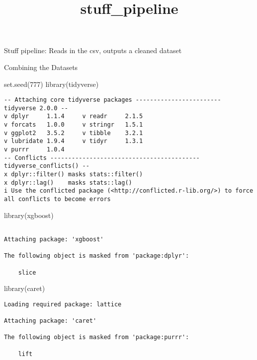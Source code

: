 \documentclass[
  letterpaper,
  DIV=11,
  numbers=noendperiod]{scrartcl}
\title{stuff\_pipeline}
\author{}
\date{}
\newenvironment{Shaded}{\begin{snugshade}}{\end{snugshade}}
\newcommand{\DecValTok}[1]{\textcolor[rgb]{0.68,0.00,0.00}{#1}}
\newcommand{\FunctionTok}[1]{\textcolor[rgb]{0.28,0.35,0.67}{#1}}
\newcommand{\NormalTok}[1]{\textcolor[rgb]{0.00,0.23,0.31}{#1}}
\begin{document}
\maketitle


Stuff pipeline: Reads in the csv, outputs a cleaned dataset

Combining the Datasets

\begin{Shaded}
\begin{Highlighting}[]
\FunctionTok{set.seed}\NormalTok{(}\DecValTok{777}\NormalTok{)}
\FunctionTok{library}\NormalTok{(tidyverse)}
\end{Highlighting}
\end{Shaded}

\begin{verbatim}
-- Attaching core tidyverse packages ------------------------ tidyverse 2.0.0 --
v dplyr     1.1.4     v readr     2.1.5
v forcats   1.0.0     v stringr   1.5.1
v ggplot2   3.5.2     v tibble    3.2.1
v lubridate 1.9.4     v tidyr     1.3.1
v purrr     1.0.4     
-- Conflicts ------------------------------------------ tidyverse_conflicts() --
x dplyr::filter() masks stats::filter()
x dplyr::lag()    masks stats::lag()
i Use the conflicted package (<http://conflicted.r-lib.org/>) to force all conflicts to become errors
\end{verbatim}

\begin{Shaded}
\begin{Highlighting}[]
\FunctionTok{library}\NormalTok{(xgboost)}
\end{Highlighting}
\end{Shaded}

\begin{verbatim}

Attaching package: 'xgboost'

The following object is masked from 'package:dplyr':

    slice
\end{verbatim}

\begin{Shaded}
\begin{Highlighting}[]
\FunctionTok{library}\NormalTok{(caret)}
\end{Highlighting}
\end{Shaded}

\begin{verbatim}
Loading required package: lattice

Attaching package: 'caret'

The following object is masked from 'package:purrr':

    lift
\end{verbatim}
\end{document}
